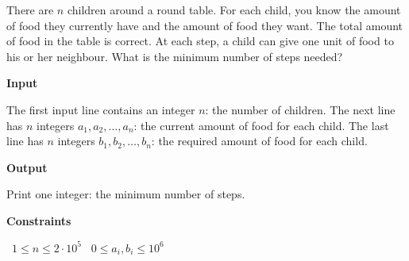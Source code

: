 There are $n$ children around a round table. For each child, you know the amount of food they currently have and the amount of food they want. The total amount of food in the table is correct.
At each step, a child can give one unit of food to his or her neighbour. What is the minimum number of steps needed?

\vspace{0.3cm}\noindent\textbf{Input}

The first input line contains an integer $n$: the number of children.
The next line has $n$ integers $a_1,a_2,\ldots,a_n$: the current amount of food for each child.
The last line has $n$ integers $b_1,b_2,\ldots,b_n$: the required amount of food for each child.

\vspace{0.3cm}\noindent\textbf{Output}

Print one integer: the minimum number of steps.

\vspace{0.3cm}\noindent\textbf{Constraints}

\textbullet\ $1 \le n \le 2 \cdot 10^5$
\textbullet\ $0 \le a_i, b_i \le 10^6$